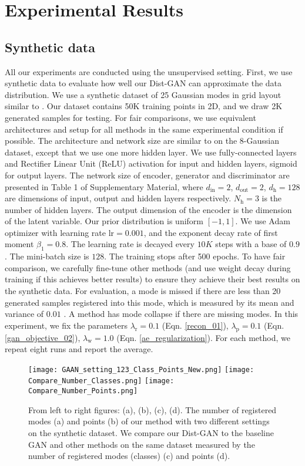 \documentclass[runningheads]{llncs}
\begin{document}
\section{Experimental Results}
\subsection{Synthetic data}
\label{synthetic_data_experiment}
All our experiments are conducted using the unsupervised setting.
First, we use  synthetic data to evaluate how well our Dist-GAN can approximate the data distribution. We use a synthetic dataset of 25 Gaussian modes in grid layout similar to \cite{dumoulin-arxiv-2016}. Our dataset contains 50K training points in 2D, and we draw 2K generated samples for testing. For fair comparisons, we use equivalent architectures and setup for all methods in the same experimental condition if possible. The architecture and network size are similar to \cite{metz-arxiv-2016} on the 8-Gaussian dataset, except that we use one more hidden layer. We use fully-connected layers and Rectifier Linear Unit (ReLU) activation for input and hidden layers, sigmoid for output layers. The network size of encoder, generator and discriminator are presented in Table 1 of Supplementary Material, where $d_\mathrm{in} = 2$, $d_\mathrm{out} = 2$, $d_\mathrm{h} = 128$ are dimensions of input, output and hidden layers respectively. $N_\mathrm{h} = 3$ is the number of hidden layers. The output dimension of the encoder is the dimension of the latent variable. Our prior distribution is  uniform $[-1,1]$. We use Adam optimizer with learning rate $\mathrm{lr} = 0.001$, and the exponent decay rate of first moment $\beta_1 = 0.8$. The learning rate is decayed every $10K$ steps with a base of $0.9$. The mini-batch size is $128$. The training stops after 500 epochs. To have fair comparison, we carefully fine-tune other methods (and use weight decay during training if this achieves better results) to ensure they achieve their best results on the synthetic data. For evaluation, a mode is missed if there are less than 20 generated samples registered into this mode, which is measured by its mean and variance of $0.01$ \cite{li-arxiv-2017,metz-arxiv-2016}. A method has mode collapse if there are missing modes. In this experiment, we fix the parameters $\lambda_{\mathrm{r}} = 0.1$ (Eqn. \ref{recon_01}), $\lambda_{\mathrm{p}} = 0.1$ (Eqn. \ref{gan_objective_02}), $\lambda_{\mathrm{w}} = 1.0$ (Eqn. \ref{ae_regularization}). For each method, we repeat eight runs and report the average.
\begin{figure*}
\centering
\texttt{[image: GAAN\_setting\_123\_Class\_Points\_New.png]}
\texttt{[image: Compare\_Number\_Classes.png]}
\texttt{[image: Compare\_Number\_Points.png]}
\caption{From left to right figures: (a), (b), (c), (d). The number of registered modes (a) and points (b) of our method with two different settings on the synthetic dataset. We compare our Dist-GAN to the baseline GAN \cite{goodfellow-nisp-2014} and other methods on the same dataset measured by the number of registered modes (classes) (c) and points (d).}
\label{toydata_comparison_01}
\end{figure*}
\end{document}
